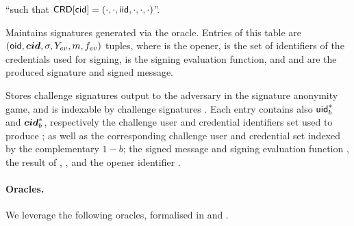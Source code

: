 \begin{description}
  ``\iid such that $\mathsf{CRD}[\mathsf{cid}] = (\cdot,\cdot,\mathsf{iid},\cdot,\cdot,\cdot)$''.
\item[\SIG.] Maintains signatures generated via the \SIGN oracle. Entries of
  this table are $(\mathsf{oid},\boldsymbol{cid},\sigma,Y_{ev},m,f_{ev})$ tuples, where \oid is
  the opener, \scid is the set of identifiers of the credentials used for
  signing, \feval is the signing evaluation function, and \sig and \msg are the
  produced signature and signed message.
\item[\CSIG.] Stores challenge signatures output to the adversary in the
  signature anonymity game, and is indexable by challenge signatures \csig.
  Each entry contains also $\mathsf{uid}^*_b$ and $\boldsymbol{cid}^*_b$, respectively the challenge
  user  and credential identifiers set used to produce \csig; as well as the
  corresponding challenge user and credential set indexed by the complementary
  $1-b$; the signed message \msg and signing evaluation function \feval, the
  result of \feval, \Yeval, and the opener identifier \oid.
\end{description}

\paragraph{Oracles.} %
We leverage the following oracles, formalised in  and
.

